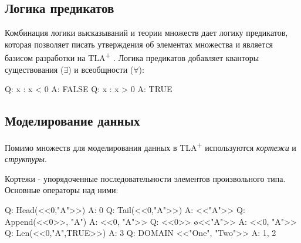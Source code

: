 \documentclass[14pt, openany]{book}
\newcommand{\tlapl}{TLA\textsuperscript{+} }
\begin{document}
\subsection{Логика предикатов}
Комбинация логики высказываний и теории множеств дает логику предикатов, которая позволяет писать утверждения об элементах множества и является базисом разработки на \tlapl. Логика предикатов добавляет кванторы существования (\(\exists\)) и всеобщности (\(\forall\)):

\begin{tla}
  Q: \E x : x < 0
  A: FALSE
  Q: \A x : x > 0
  A: TRUE
\end{tla}
\begin{tlatex}
%
%
%
%
\end{tlatex}

\subsection{Моделирование данных}
Помимо множеств для моделирования данных в \tlapl используются \emph{кортежи} и \emph{структуры}.

Кортежи - упорядоченные последовательности элементов произвольного типа. Основные операторы над ними:
\begin{tla}
  Q: Head(<<0,"A">>)
  A: 0
  Q: Tail(<<0,"A">>)
  A: <<"A">>
  Q: Append(<<0>>, "A")
  A: <<0, "A">>
  Q: <<0>> \o <<"A">> 
  A: <<0, "A">>
  Q: Len(<<0,"A",TRUE>>)
  A: 3
  Q: DOMAIN <<"One", "Two">> 
  A: {1, 2}
\end{tla}
\begin{tlatex}
%
%
%
%
%
%
%
%
%
%
%
\end{tlatex}
\end{document}
